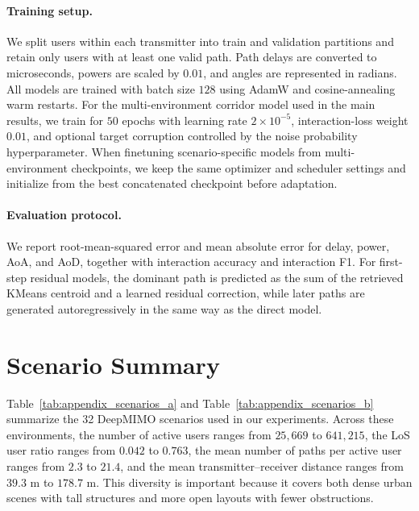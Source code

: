 \paragraph{Training setup.}
We split users within each transmitter into train and validation partitions and retain only users with at least one valid path. Path delays are converted to microseconds, powers are scaled by \(0.01\), and angles are represented in radians. All models are trained with batch size \(128\) using AdamW and cosine-annealing warm restarts. For the multi-environment corridor model used in the main results, we train for \(50\) epochs with learning rate \(2\times10^{-5}\), interaction-loss weight \(0.01\), and optional target corruption controlled by the noise probability hyperparameter. When finetuning scenario-specific models from multi-environment checkpoints, we keep the same optimizer and scheduler settings and initialize from the best concatenated checkpoint before adaptation.

\paragraph{Evaluation protocol.}
We report root-mean-squared error and mean absolute error for delay, power, AoA, and AoD, together with interaction accuracy and interaction F1. For first-step residual models, the dominant path is predicted as the sum of the retrieved KMeans centroid and a learned residual correction, while later paths are generated autoregressively in the same way as the direct model.

\section{Scenario Summary}
\label{appendix:scenarios}

Table~\ref{tab:appendix_scenarios_a} and Table~\ref{tab:appendix_scenarios_b} summarize the 32 DeepMIMO scenarios used in our experiments. Across these environments, the number of active users ranges from \(25{,}669\) to \(641{,}215\), the LoS user ratio ranges from \(0.042\) to \(0.763\), the mean number of paths per active user ranges from \(2.3\) to \(21.4\), and the mean transmitter--receiver distance ranges from \(39.3\) m to \(178.7\) m. This diversity is important because it covers both dense urban scenes with tall structures and more open layouts with fewer obstructions.

